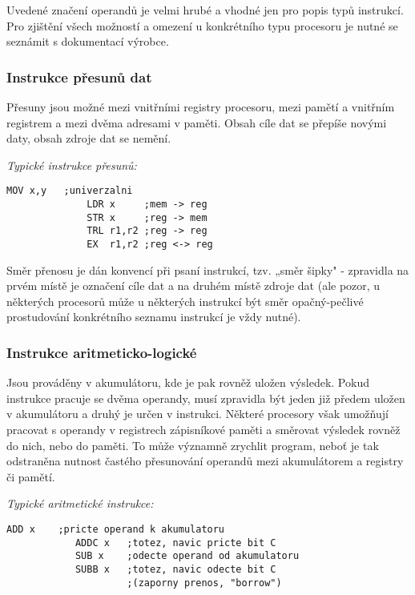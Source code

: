         Uvedené značení operandů je velmi hrubé a vhodné jen pro popis typů instrukcí. Pro zjištění 
        všech možností a omezení u konkrétního typu procesoru je nutné se seznámit s dokumentací 
        výrobce.
        
        \subsubsection{Instrukce přesunů dat}
          Přesuny jsou možné mezi vnitřními registry procesoru, mezi pamětí a vnitřním registrem a 
          mezi dvěma adresami v paměti. Obsah cíle dat se přepíše novými daty, obsah zdroje dat se 
          nemění.
        
          \emph{Typické instrukce přesunů:}
            \begin{lstlisting}[gobble=10]
              MOV x,y   ;univerzalni
              LDR x     ;mem -> reg
              STR x     ;reg -> mem
              TRL r1,r2 ;reg -> reg
              EX  r1,r2 ;reg <-> reg
            \end{lstlisting}
      
          Směr přenosu je dán konvencí při psaní instrukcí, tzv. „směr šipky" - zpravidla na prvém 
          místě je označení cíle dat a na druhém místě zdroje dat (ale pozor, u některých procesorů 
          může u některých instrukcí být směr opačný-pečlivé prostudování konkrétního seznamu 
          instrukcí je vždy nutné).
          
        \subsubsection{Instrukce aritmeticko-logické}           
          Jsou prováděny v akumulátoru, kde je pak rovněž uložen výsledek. Pokud instrukce pracuje 
          se dvěma operandy, musí zpravidla být jeden již předem uložen v akumulátoru a druhý je 
          určen v instrukci. Některé procesory však umožňují pracovat s operandy v registrech 
          zápisníkové paměti a směrovat výsledek rovněž do nich, nebo do paměti. To může významně 
          zrychlit program, neboť je tak odstraněna  nutnost častého přesunování operandů mezi 
          akumulátorem a registry či pamětí.
         
          \emph{Typické aritmetické instrukce:}
          \begin{lstlisting}[gobble=10]
            ADD x    ;pricte operand k akumulatoru
            ADDC x   ;totez, navic pricte bit C
            SUB x    ;odecte operand od akumulatoru
            SUBB x   ;totez, navic odecte bit C 
                     ;(zaporny prenos, "borrow")
          \end{lstlisting}
         
